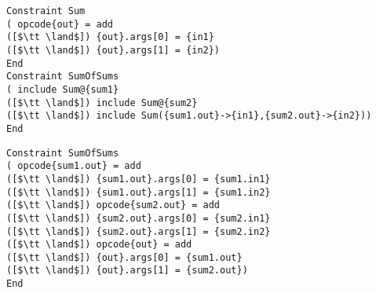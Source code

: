 \begin{lstlisting}[language=CAnDL,basicstyle=\linespread{0.984}\ttfamily]
Constraint Sum
( opcode{out} = add
([$\tt \land$]) {out}.args[0] = {in1}
([$\tt \land$]) {out}.args[1] = {in2})
End
Constraint SumOfSums
( include Sum@{sum1}
([$\tt \land$]) include Sum@{sum2}
([$\tt \land$]) include Sum({sum1.out}->{in1},{sum2.out}->{in2}))
End
\end{lstlisting}
\begin{lstlisting}[language=CAnDL,basicstyle=\linespread{0.984}\ttfamily]
Constraint SumOfSums
( opcode{sum1.out} = add
([$\tt \land$]) {sum1.out}.args[0] = {sum1.in1}
([$\tt \land$]) {sum1.out}.args[1] = {sum1.in2}
([$\tt \land$]) opcode{sum2.out} = add
([$\tt \land$]) {sum2.out}.args[0] = {sum2.in1}
([$\tt \land$]) {sum2.out}.args[1] = {sum2.in2}
([$\tt \land$]) opcode{out} = add
([$\tt \land$]) {out}.args[0] = {sum1.out}
([$\tt \land$]) {out}.args[1] = {sum2.out})
End
\end{lstlisting}